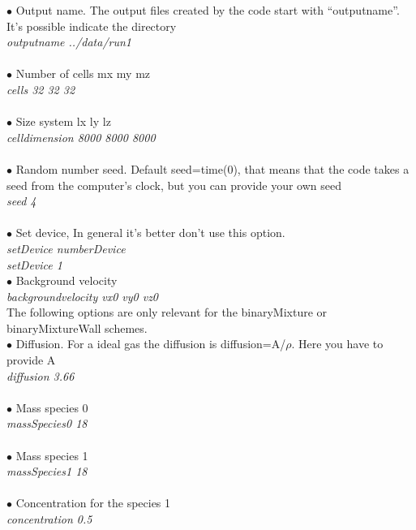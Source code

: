\documentclass[aps,prl]{revtex4}
\begin{document}
$\bullet$ Output name. The output files created by the code start with ``outputname''. It's
possible indicate the directory \\
\emph{outputname		../data/run1} \\\\

$\bullet$ Number of cells mx my mz \\
\emph{cells			32	32	32} \\\\

$\bullet$ Size system lx ly lz \\
\emph{celldimension		8000	8000	8000} \\\\


$\bullet$ Random number seed. Default seed=time(0), that means that the code takes a seed from the
computer's clock, but you can provide your own seed \\
\emph{seed			4} \\ \\

$\bullet$ Set device, In general it's better don't use this option. \\
\emph{setDevice                 numberDevice} \\
\emph{setDevice                 1} \\

$\bullet$ Background velocity \\
\emph{backgroundvelocity vx0 vy0 vz0} \\

The following options are only relevant for the binaryMixture or binaryMixtureWall schemes. \\

$\bullet$ Diffusion. For a ideal gas the diffusion is diffusion=A/$\rho$. Here you have to
provide A \\
\emph{diffusion	     3.66} \\ \\

$\bullet$ Mass species 0 \\
\emph{massSpecies0	18}\\\\
$\bullet$ Mass species 1 \\
\emph{massSpecies1	18}\\\\
$\bullet$ Concentration for the species 1 \\
\emph{concentration 	0.5}\\\\
\end{document}
